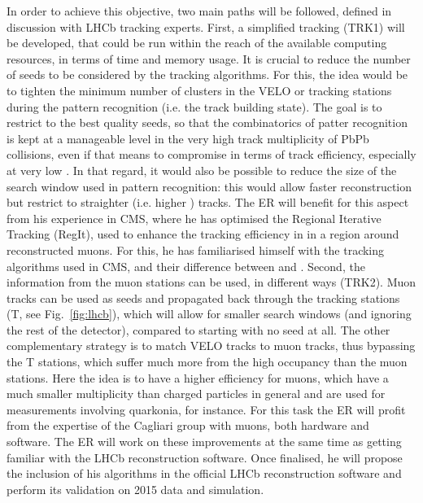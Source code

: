 \documentclass[a4paper,11pt]{article}
\newcommand{\ER}{ER\xspace}
\begin{document}
In order to achieve this objective, two main paths will be followed, defined in discussion with LHCb tracking experts.
First, a simplified tracking (TRK1) will be developed, that could be run within the reach of the available computing resources, in terms of time and memory usage. It is crucial to reduce the number of seeds to be considered by the tracking algorithms. For this, the idea would be to tighten the minimum number of clusters in 
the VELO or tracking stations during the pattern recognition (i.e. the track building state). 
The goal is to restrict to the best quality seeds, so that the combinatorics of patter recognition is kept at a manageable level in the very high track multiplicity of PbPb collisions, even if that means to compromise in terms of track efficiency, especially at very low \pt. In that regard, it would also be possible to reduce the size of the search window used in pattern recognition: this would allow faster reconstruction but restrict to straighter (i.e. higher \pt) tracks.
The \ER will benefit for this aspect from his experience in CMS, where he has optimised the Regional Iterative Tracking (RegIt), used to enhance the tracking efficiency in \pbpb in a region around reconstructed muons. For this, he has familiarised himself with the tracking algorithms used in CMS, and their difference between \pp and \pbpb.
%
Second, the information from the muon stations can be used, in different ways (TRK2). Muon tracks can be used as seeds and propagated back through the tracking stations (T, see Fig.~\ref{fig:lhcb}), which will allow for smaller search windows (and ignoring the rest of the detector), compared to starting with no seed at all. The other complementary strategy is to match VELO tracks to muon tracks, thus bypassing the T stations, which suffer much more from the high occupancy than the muon stations. Here the idea is to have a higher efficiency for muons, which have a much smaller multiplicity than charged particles in general and are used for measurements involving quarkonia, for instance. For this task the \ER will profit from the expertise of the Cagliari group with muons, both hardware and software.
%
The \ER will work on these improvements at the same time as getting familiar with the LHCb reconstruction software. Once finalised, he will propose the inclusion of his algorithms in the official LHCb reconstruction software and perform its validation on 2015 \pbpb data and simulation.
\end{document}
